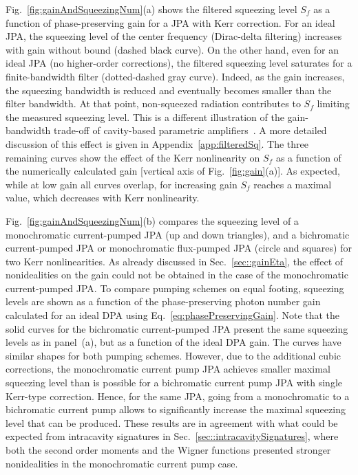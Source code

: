\documentclass[pra,twocolumn,superscriptaddress]{revtex4-1}
\begin{document}
% 
Fig.~\ref{fig:gainAndSqueezingNum}(a) shows the filtered squeezing level $S_f$ as a function of phase-preserving gain for a JPA with Kerr correction.
% 
For an ideal JPA, the squeezing level of the center frequency (Dirac-delta filtering) increases with gain without bound (dashed black curve).
% 
On the other hand, even for an ideal JPA (no higher-order corrections), the filtered squeezing level saturates for a finite-bandwidth filter  (dotted-dashed gray curve).
% 
Indeed, as the gain increases, the squeezing bandwidth is reduced and eventually becomes smaller than the filter bandwidth. At that point, non-squeezed radiation contributes to $S_f$ limiting the measured squeezing level.
This is a different illustration of the gain-bandwidth trade-off of cavity-based parametric amplifiers~\cite{Clerk:2010dq}. A more detailed discussion of this effect is given in Appendix~\ref{app:filteredSq}.
The three remaining curves show the effect of the Kerr nonlinearity on $S_f$ as a function of the numerically calculated gain [vertical axis of Fig.~\ref{fig:gain}(a)]. As expected, while at low gain all curves overlap, for increasing gain $S_f$ reaches a maximal value, which decreases with Kerr nonlinearity.

Fig.~\ref{fig:gainAndSqueezingNum}(b) compares the squeezing level of a monochromatic current-pumped JPA (up and down triangles), and  a bichromatic current-pumped JPA or monochromatic flux-pumped JPA (circle and squares) for two Kerr nonlinearities. 
% 
As already discussed in Sec.~\ref{sec::gainEta}, the effect of nonidealities on the gain could not be obtained in the case of the monochromatic current-pumped JPA.
% 
To compare pumping schemes on equal footing, squeezing levels are shown as a function of the phase-preserving photon number gain calculated for an ideal DPA using Eq.~\eqref{eq:phasePreservingGain}. Note that the solid curves for the bichromatic current-pumped JPA present the same squeezing levels as in panel~(a), but as a function of the ideal DPA gain.
% 
The curves have similar shapes for both pumping schemes. However, due to the additional cubic corrections, the monochromatic current pump JPA achieves smaller maximal squeezing level than is possible for a bichromatic current pump JPA with single Kerr-type correction. Hence, for the same JPA, going from a monochromatic to a bichromatic current pump allows to significantly increase the maximal squeezing level that can be produced. 
% 
These results are in agreement with what could be expected from intracavity signatures in Sec.~\ref{sec::intracavitySignatures}, where both the second order moments and the Wigner functions presented stronger nonidealities in the monochromatic current pump case.
\end{document}
